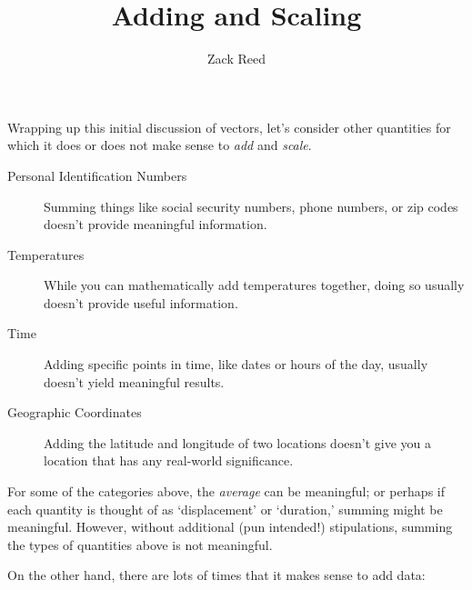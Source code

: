 \documentclass{ximera}
\author{Zack Reed}
\title{Adding and Scaling}
\begin{document}
\begin{abstract}

\end{abstract}
\maketitle

\begin{exploration}

  Wrapping up this initial discussion of vectors, let's consider other quantities for which it does or does not make sense to \emph{add} and \emph{scale}.

  \begin{example}

\begin{description}
\item[Personal Identification Numbers] Summing things like social
  security numbers, phone numbers, or zip codes doesn't provide
  meaningful information.
\item[Temperatures] While you can mathematically add temperatures
  together, doing so usually doesn't provide useful information.
\item[Time] Adding specific points in time, like dates or hours of the
  day, usually doesn't yield meaningful results.
\item[Geographic Coordinates] Adding the latitude and longitude of two
  locations doesn't give you a location that has any real-world
  significance.
\end{description}
\end{example}

For some of the categories above, the \textit{average} can be
meaningful; or perhaps if each quantity is thought of as
`displacement' or `duration,' summing might be meaningful. However,
without additional (pun intended!) stipulations, summing the types of
quantities above is not meaningful.

\begin{example}

On the other hand, there are lots of
times that it makes sense to add data:



\end{example}
\end{exploration}
\end{document}
